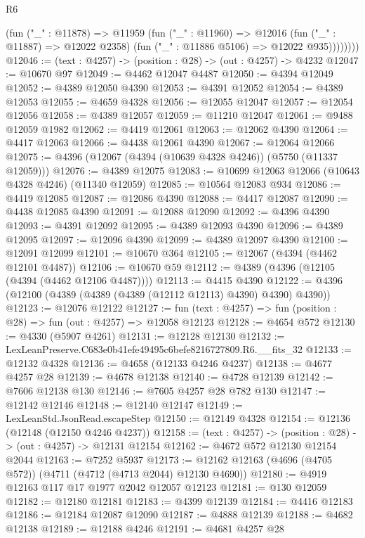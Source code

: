 \begin{lexlean}{R6}
\begin{coremodule}
              (fun ("_" : @11878) =>
              @11959
                (fun ("_" : @11960) =>
                @12016
                  (fun ("_" : @11887) => @12022 @2358)
                  (fun ("_" : @11886 @5106) => @12022 @935))))))))
@12046 := (text : @4257) -> (position : @28) -> (out : @4257) -> @4232
@12047 := @10670 @97
@12049 := @4462 @12047 @4487
@12050 := @4394 @12049
@12052 := @4389 @12050 @4390
@12053 := @4391 @12052
@12054 := @4389 @12053
@12055 := @4659 @4328
@12056 := @12055 @12047
@12057 := @12054 @12056
@12058 := @4389 @12057
@12059 := @11210 @12047
@12061 := @9488 @12059 @1982
@12062 := @4419 @12061
@12063 := @12062 @4390
@12064 := @4417 @12063
@12066 := @4438 @12061 @4390
@12067 := @12064 @12066
@12075 := @4396 (@12067 (@4394 (@10639 @4328 @4246)) (@5750 (@11337 @12059)))
@12076 := @4389 @12075
@12083 := @10699 @12063 @12066 (@10643 @4328 @4246) (@11340 @12059)
@12085 := @10564 @12083 @934
@12086 := @4419 @12085
@12087 := @12086 @4390
@12088 := @4417 @12087
@12090 := @4438 @12085 @4390
@12091 := @12088 @12090
@12092 := @4396 @4390
@12093 := @4391 @12092
@12095 := @4389 @12093 @4390
@12096 := @4389 @12095
@12097 := @12096 @4390
@12099 := @4389 @12097 @4390
@12100 := @12091 @12099
@12101 := @10670 @364
@12105 := @12067 (@4394 (@4462 @12101 @4487))
@12106 := @10670 @59
@12112 := @4389 (@4396 (@12105 (@4394 (@4462 @12106 @4487))))
@12113 := @4415 @4390
@12122 := @4396 (@12100 (@4389 (@4389 (@4389 (@12112 @12113) @4390) @4390) @4390))
@12123 := @12076 @12122
@12127 := fun (text : @4257) => fun (position : @28) => fun (out : @4257) => @12058 @12123
@12128 := @4654 @572
@12130 := @4330 (@5907 @4261)
@12131 := @12128 @12130
@12132 := LexLeanPreserve.C683e0b41efe49495c6befe8216727809.R6.__fits_32
@12133 := @12132 @4328
@12136 := @4658 (@12133 @4246 @4237)
@12138 := @4677 @4257 @28
@12139 := @4678 @12138
@12140 := @4728 @12139
@12142 := @7606 @12138 @130
@12146 := @7605 @4257 @28 @782 @130
@12147 := @12142 @12146
@12148 := @12140 @12147
@12149 := LexLeanStd.JsonRead.escapeStep
@12150 := @12149 @4328
@12154 := @12136 (@12148 (@12150 @4246 @4237))
@12158 := (text : @4257) -> (position : @28) -> (out : @4257) -> @12131 @12154
@12162 := @4672 @572 @12130 @12154 @2044
@12163 := @7252 @5937
@12173 := @12162 @12163 (@4696 (@4705 @572)) (@4711 (@4712 (@4713 @2044) @12130 @4690))
@12180 := @4919 @12163 @117 @17 @1977 @2042 @12057 @12123
@12181 := @130 @12059
@12182 := @12180 @12181
@12183 := @4399 @12139
@12184 := @4416 @12183
@12186 := @12184 @12087 @12090
@12187 := @4888 @12139
@12188 := @4682 @12138
@12189 := @12188 @4246
@12191 := @4681 @4257 @28

\end{coremodule}
\end{lexlean}
